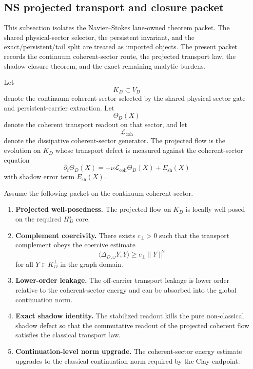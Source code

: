 
\subsection{NS projected transport and closure packet}\label{sub:NSProjectedTransportAndClosurePacket}

This subsection isolates the Navier--Stokes lane-owned theorem packet.
The shared physical-sector selector, the persistent invariant, and the exact/persistent/tail split are treated as imported objects.
The present packet records the continuum coherent-sector route, the projected transport law, the shadow closure theorem, and the exact remaining analytic burdens.

\begin{definition}\label{def:NSContinuumCoherentSectorAndProjectedFlow}
Let
\[
  K_D
  \subset
  V_D
\]
denote the continuum coherent sector selected by the shared physical-sector gate and persistent-carrier extraction.
Let
\[
  \Theta_D(X)
\]
denote the coherent transport readout on that sector, and let
\[
  \mathcal L_{\mathrm{coh}}
\]
denote the dissipative coherent-sector generator.
The projected flow is the evolution on $K_D$ whose transport defect is measured against the coherent-sector equation
\[
  \partial_t \Theta_D(X)
  =
  - \nu \mathcal L_{\mathrm{coh}} \Theta_D(X)
  + E_{\mathrm{sh}}(X)
\]
with shadow error term $E_{\mathrm{sh}}(X)$.
\end{definition}

\begin{assumption}\label{as:NSProjectedTransportClosureInputs}
Assume the following packet on the continuum coherent sector.
\begin{enumerate}
  \item \textbf{Projected well-posedness.}
  The projected flow on $K_D$ is locally well posed on the required $H_D^s$ core.
  \item \textbf{Complement coercivity.}
  There exists $c_{\perp}>0$ such that the transport complement obeys the coercive estimate
  \[
    \langle \Delta_{D,\omega} Y, Y \rangle
    \ge
    c_{\perp} \|Y\|^2
  \]
  for all $Y \in K_D^{\perp}$ in the graph domain.
  \item \textbf{Lower-order leakage.}
  The off-carrier transport leakage is lower order relative to the coherent-sector energy and can be absorbed into the global continuation norm.
  \item \textbf{Exact shadow identity.}
  The stabilized readout kills the pure non-classical shadow defect so that the commutative readout of the projected coherent flow satisfies the classical transport law.
  \item \textbf{Continuation-level norm upgrade.}
  The coherent-sector energy estimate upgrades to the classical continuation norm required by the Clay endpoint.
\end{enumerate}
\end{assumption}

